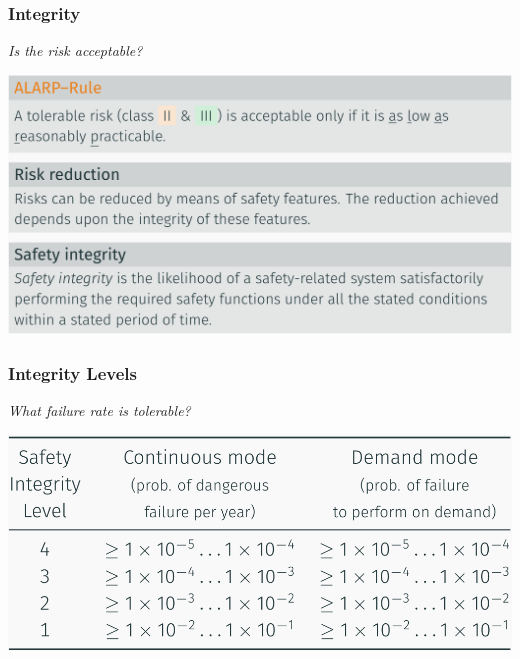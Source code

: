 \documentclass[
  10pt,
  a4paper,
]{article}
\begin{document}
\begin{multicols*}{2}
\begin{minipage}[c][1cm][c]{.7\columnwidth}

\subsubsection{Integrity}\label{integrity}

\vspace{-2mm}{\color{Orchid}\faQuestionCircle[regular]} \emph{Is the
risk acceptable?}

\end{minipage}%
\begin{minipage}[c][1cm][c]{.3\columnwidth}
\makebox[30mm][r]{
\resizebox{!}{0.9cm}{
  
}}
\end{minipage}

\includegraphics{images/safety/image-6.png}

\subsubsection{Integrity Levels}\label{integrity-levels}

\vspace{-2mm}{\color{Orchid}\faQuestionCircle[regular]} \emph{What
failure rate is tolerable?}

\includegraphics{images/safety/image-7.png}


\end{multicols*}
\end{document}
